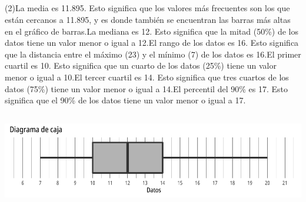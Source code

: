 \documentclass{cdplf-prueba}
\begin{document}
\subsection{}
\begin{tasks}[label={\tcbox[colback=black!60, colframe=black!60, coltext=white, on line, boxsep=0pt, left=3pt, right=3pt, top=2pt, bottom=2pt]{\sffamily\bfseries\alph*}},
item-indent=1.2cm,column-sep=20pt,label-offset=0.3cm,label-width=15pt,after-item-skip=10pt,item-format=\raggedright](2)\task La media es 11.895.
 Esto significa que los valores más frecuentes son los que están cercanos a 11.895, y es donde también se encuentran las barras más altas 
 en el gráfico de barras.\task La mediana es 12. 
 Esto significa que la mitad (50\%) de los datos tiene un valor menor 
 o igual a 12.\task El rango de los datos es 16. Esto 
 significa que la distancia entre el máximo (23) y el mínimo (7) de los datos es 16.\task El primer cuartil es 10. Esto significa que un cuarto de los datos (25\%) tiene un valor 
 menor o igual a 10.\task El tercer cuartil es 14. Esto significa que tres cuartos de los datos (75\%) tiene un valor menor
 o igual a 14.\task El percentil del 90\% es 17. Esto significa que el 90\% de los datos tiene un valor menor o igual a 17.\end{tasks}
\subsection{}
\begin{center}\includegraphics{diagrama_caja_2.pdf}\end{center}
\end{document}
